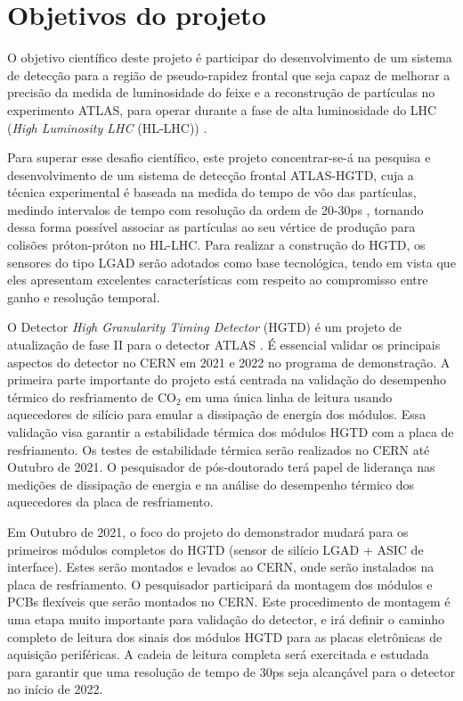 
\chapter{Objetivos do projeto}

O objetivo científico deste projeto é participar do desenvolvimento de um sistema de detecção para a região de pseudo-rapidez frontal que seja capaz de melhorar a precisão da medida de luminosidade do feixe e a reconstrução de partículas no experimento ATLAS, para operar durante a fase de alta luminosidade do LHC ({\it High Luminosity LHC} (HL-LHC)) \cite{HL_LHC,tdr}. 

Para superar esse desafio científico, este projeto concentrar-se-á na pesquisa e desenvolvimento de um sistema de detecção frontal ATLAS-HGTD, cuja a técnica experimental é baseada na medida do tempo de vôo das partículas, medindo intervalos de tempo com resolução da ordem de 20-30ps \cite{tdr}, tornando dessa forma possível associar as partículas ao seu vértice de produção para colisões próton-próton no HL-LHC. Para realizar a construção do HGTD, os sensores do tipo LGAD serão adotados como base tecnológica, tendo em vista que eles apresentam excelentes características com respeito ao compromisso entre ganho e resolução temporal. 
\thispagestyle{plain}

O Detector \textit{High Granularity Timing Detector} (HGTD) é um projeto de atualização de fase II para o detector ATLAS \cite{tdr}. É essencial validar os principais aspectos do detector no CERN em 2021 e 2022 no programa de demonstração. A primeira parte importante do projeto está centrada na validação do desempenho térmico do resfriamento de CO$_{2}$ em uma única linha de leitura usando aquecedores de silício para emular a dissipação de energia dos módulos. Essa validação visa garantir a estabilidade térmica dos módulos HGTD com a placa de resfriamento. Os testes de estabilidade térmica serão realizados no CERN até Outubro de 2021. O pesquisador de pós-doutorado terá papel de liderança nas medições de dissipação de energia e na análise do desempenho térmico dos aquecedores da placa de resfriamento.

Em Outubro de 2021, o foco do projeto do demonstrador mudará para os primeiros módulos completos do HGTD (sensor de silício LGAD + ASIC de interface). Estes serão montados e levados ao CERN, onde serão instalados na placa de resfriamento. O pesquisador participará da montagem dos módulos e PCBs flexíveis que serão montados no CERN. Este procedimento de montagem é uma etapa muito importante para validação do detector, e irá definir o caminho completo de leitura dos sinais dos módulos HGTD para as placas eletrônicas de aquisição periféricas. A cadeia de leitura completa será exercitada e estudada para garantir que uma resolução de tempo de 30ps seja alcançável para o detector no início de 2022.

